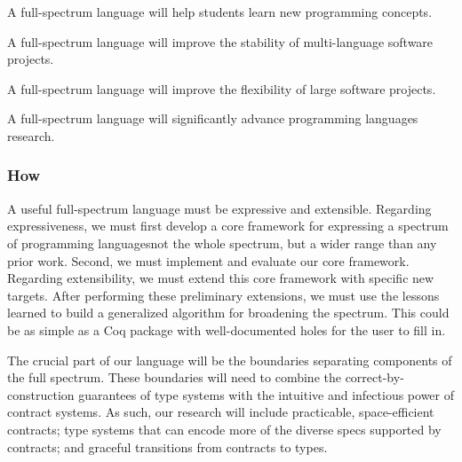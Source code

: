 \documentclass{article}
\begin{document}
A full-spectrum language will help students learn new programming concepts. %

A full-spectrum language will improve the stability of multi-language software projects.

A full-spectrum language will improve the flexibility of large software projects.

A full-spectrum language will significantly advance programming languages research.

\vfill{}
\subsubsection*{How}


A useful full-spectrum language must be expressive and extensible.
Regarding expressiveness, we must first develop a core framework for expressing a spectrum of programming languages\textemdash not the whole spectrum, but a wider range than any prior work.
Second, we must implement and evaluate our core framework.
Regarding extensibility, we must extend this core framework with specific new targets.
After performing these preliminary extensions, we must use the lessons learned to build a generalized algorithm for broadening the spectrum.
This could be as simple as a Coq package with well-documented holes for the user to fill in.

The crucial part of our language will be the boundaries separating components of the full spectrum.
These boundaries will need to combine the correct-by-construction guarantees of type systems with the intuitive and infectious power of contract systems.
As such, our research will include practicable, space-efficient contracts; type systems that can encode more of the diverse specs supported by contracts; and graceful transitions from contracts to types.
\end{document}
